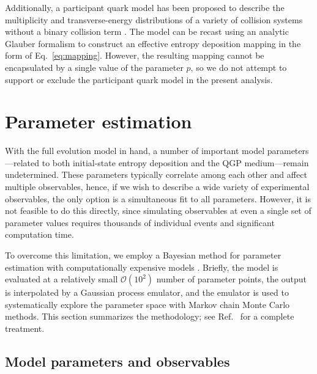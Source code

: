 \documentclass[aps,prc,reprint,amsmath,nofootinbib]{revtex4-1}
\newcommand{\order}[1]{$\mathcal O(10^{#1})$}
\begin{document}
Additionally, a participant quark model has been proposed to describe the multiplicity and transverse-energy distributions of a variety of collision systems without a binary collision term \cite{Adler:2013aqf, Adare:2015bua}.
The model can be recast using an analytic Glauber formalism to construct an effective entropy deposition mapping in the form of Eq.~\eqref{eq:mapping}.
However, the resulting mapping cannot be encapsulated by a single value of the parameter $p$, so we do not attempt to support or exclude the participant quark model in the present analysis.


\section{Parameter estimation}

With the full evolution model in hand, a number of important model parameters---related to both initial-state entropy deposition and the QGP medium---remain undetermined.
These parameters typically correlate among each other and affect multiple observables, hence, if we wish to describe a wide variety of experimental observables, the only option is a simultaneous fit to all parameters.
However, it is not feasible to do this directly, since simulating observables at even a single set of parameter values requires thousands of individual events and significant computation time.

To overcome this limitation, we employ a Bayesian method for parameter estimation with computationally expensive models \cite{OHagan:2006ba,Higdon:2008cmc,Higdon:2014tva,Wesolowski:2015fqa}.
Briefly, the model is evaluated at a relatively small \order 2 number of parameter points, the output is interpolated by a Gaussian process emulator, and the emulator is used to systematically explore the parameter space with Markov chain Monte Carlo methods.
This section summarizes the methodology; see Ref.~\cite{Bernhard:2015hxa} for a complete treatment.

\subsection{Model parameters and observables}
\end{document}
